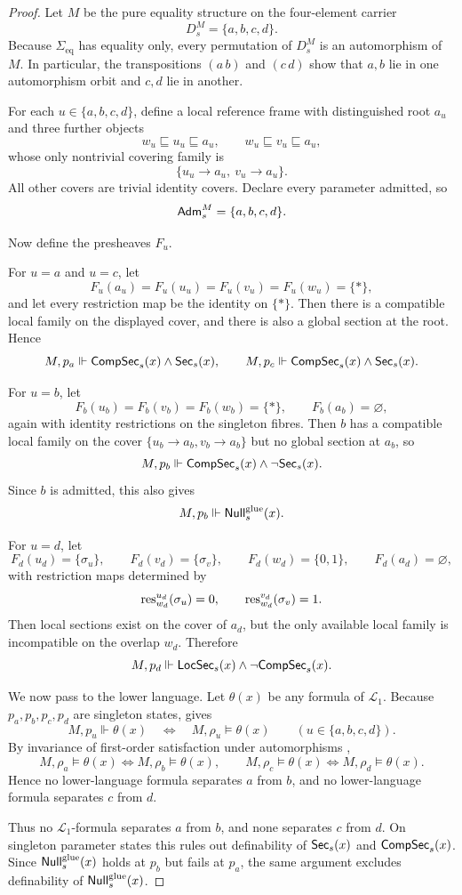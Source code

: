 \begin{proof}
Let $M$ be the pure equality structure on the four-element carrier
\[
D_s^M=\{a,b,c,d\}.
\]
Because $\Sigma_{\mathrm{eq}}$ has equality only, every permutation of $D_s^M$ is an automorphism of $M$. In particular, the transpositions $(a\,b)$ and $(c\,d)$ show that $a,b$ lie in one automorphism orbit and $c,d$ lie in another.

For each $u\in\{a,b,c,d\}$, define a local reference frame with distinguished root $a_u$ and three further objects
\[
w_u\sqsubseteq u_u\sqsubseteq a_u,
\qquad
w_u\sqsubseteq v_u\sqsubseteq a_u,
\]
whose only nontrivial covering family is
\[
\{u_u\to a_u,\ v_u\to a_u\}.
\]
All other covers are trivial identity covers. Declare every parameter admitted, so
\[
\mathsf{Adm}_s^M=\{a,b,c,d\}.
\]

Now define the presheaves $F_u$.

For $u=a$ and $u=c$, let
\[
F_u(a_u)=F_u(u_u)=F_u(v_u)=F_u(w_u)=\{*\},
\]
and let every restriction map be the identity on $\{*\}$. Then there is a compatible local family on the displayed cover, and there is also a global section at the root. Hence
\[
M,p_a\Vdash \mathsf{CompSec}_s(x)\land \mathsf{Sec}_s(x),
\qquad
M,p_c\Vdash \mathsf{CompSec}_s(x)\land \mathsf{Sec}_s(x).
\]

For $u=b$, let
\[
F_b(u_b)=F_b(v_b)=F_b(w_b)=\{*\},
\qquad
F_b(a_b)=\varnothing,
\]
again with identity restrictions on the singleton fibres. Then $b$ has a compatible local family on the cover $\{u_b\to a_b,v_b\to a_b\}$ but no global section at $a_b$, so
\[
M,p_b\Vdash \mathsf{CompSec}_s(x)\land \neg\mathsf{Sec}_s(x).
\]
Since $b$ is admitted, this also gives
\[
M,p_b\Vdash \mathsf{Null}^{\mathrm{glue}}_s(x).
\]

For $u=d$, let
\[
F_d(u_d)=\{\sigma_u\},\qquad
F_d(v_d)=\{\sigma_v\},\qquad
F_d(w_d)=\{0,1\},\qquad
F_d(a_d)=\varnothing,
\]
with restriction maps determined by
\[
\mathrm{res}_{w_d}^{u_d}(\sigma_u)=0,
\qquad
\mathrm{res}_{w_d}^{v_d}(\sigma_v)=1.
\]
Then local sections exist on the cover of $a_d$, but the only available local family is incompatible on the overlap $w_d$. Therefore
\[
M,p_d\Vdash \mathsf{LocSec}_s(x)\land \neg\mathsf{CompSec}_s(x).
\]

We now pass to the lower language. Let $\theta(x)$ be any formula of $\mathcal L_1$. Because $p_a,p_b,p_c,p_d$ are singleton states,  gives
\[
M,p_u\Vdash\theta(x)
\quad\Longleftrightarrow\quad
M,\rho_u\models\theta(x)
\qquad
(u\in\{a,b,c,d\}).
\]
By invariance of first-order satisfaction under automorphisms \cite[Theorem~1.3.9]{HodgesShorter1997},
\[
M,\rho_a\models\theta(x)
\Longleftrightarrow
M,\rho_b\models\theta(x),
\qquad
M,\rho_c\models\theta(x)
\Longleftrightarrow
M,\rho_d\models\theta(x).
\]
Hence no lower-language formula separates $a$ from $b$, and no lower-language formula separates $c$ from $d$.

Thus no $\mathcal L_1$-formula separates $a$ from $b$, and none separates $c$ from $d$. On singleton parameter states this rules out definability of $\mathsf{Sec}_s(x)$ and $\mathsf{CompSec}_s(x)$. Since $\mathsf{Null}^{\mathrm{glue}}_s(x)$ holds at $p_b$ but fails at $p_a$, the same argument excludes definability of $\mathsf{Null}^{\mathrm{glue}}_s(x)$.
\end{proof}

